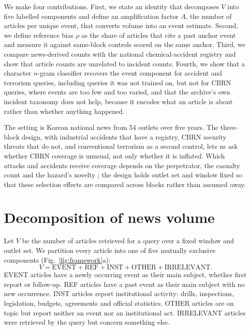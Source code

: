 \documentclass[1p,times]{elsarticle}
\begin{document}
We make four contributions. First, we state an identity that decomposes $V$ into five labelled components and define an amplification factor $A$, the number of articles per unique event, that converts volume into an event estimate. Second, we define reference bias $\rho$ as the share of articles that cite a past anchor event and measure it against same-block controls scored on the same anchor. Third, we compare news-derived counts with the national chemical-accident registry and show that article counts are unrelated to incident counts. Fourth, we show that a character $n$-gram classifier recovers the event component for accident and terrorism queries, including queries it was not trained on, but not for CBRN queries, where events are too few and too varied, and that the archive's own incident taxonomy does not help, because it encodes what an article is about rather than whether anything happened.

The setting is Korean national news from 54 outlets over five years. The three-block design, with industrial accidents that have a registry, CBRN security threats that do not, and conventional terrorism as a second control, lets us ask whether CBRN coverage is unusual, not only whether it is inflated. Which attacks and accidents receive coverage depends on the perpetrator, the casualty count and the hazard's novelty \cite{kearns2019,eisensee2007}; the design holds outlet set and window fixed so that these selection effects are compared across blocks rather than assumed away.

\section{Decomposition of news volume}
\label{sec:framework}

Let $V$ be the number of articles retrieved for a query over a fixed window and outlet set. We partition every article into one of five mutually exclusive components (Fig.~\ref{fig:framework}a):
\begin{equation}
V = \mathrm{EVENT} + \mathrm{REF} + \mathrm{INST} + \mathrm{OTHER} + \mathrm{IRRELEVANT}.
\label{eq:identity}
\end{equation}
EVENT articles have a newly occurring event as their main subject, whether first report or follow-up. REF articles have a past event as their main subject with no new occurrence. INST articles report institutional activity: drills, inspections, legislation, budgets, agreements and official statistics. OTHER articles are on topic but report neither an event nor an institutional act. IRRELEVANT articles were retrieved by the query but concern something else.
\end{document}
